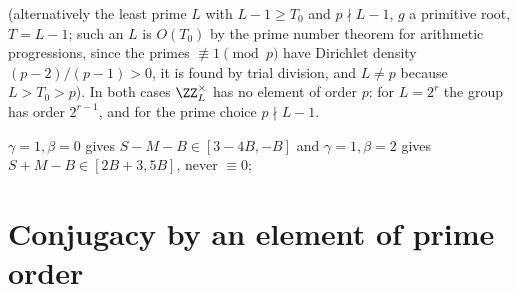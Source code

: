 \begin{thm}[first moment]
(alternatively the least prime $L$ with $L-1\ge T_0$ and $p\nmid L-1$, $g$ a primitive root, $T=L-1$; such an $L$ is $O(T_0)$ by the prime
number theorem for arithmetic progressions, since the primes $\not\equiv1\pmod p$ have Dirichlet density $(p-2)/(p-1)>0$, it is found by
trial division, and $L\ne p$ because $L>T_0>p$). In both cases $\ZZ_L^{\times}$ has no element of order $p$: for $L=2^{r}$ the group has
order $2^{r-1}$, and for the prime choice $p\nmid L-1$.

$\gamma=1,\beta=0$ gives $S-M-B\in[3-4B,-B]$ and $\gamma=1,\beta=2$ gives $S+M-B\in[2B+3,5B]$, never $\equiv0$;

\section{Conjugacy by an element of prime order}\label{sec:hard}
\begin{defi}\label{def:dzero}

\end{defi}
\end{thm}
